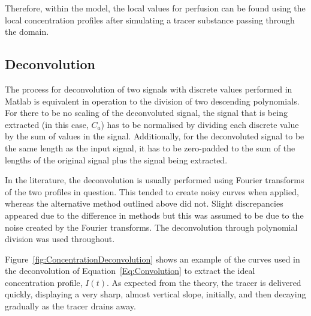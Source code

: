 \documentclass[11pt,english,a4paper,twoside,openright]{report}
\begin{document}
{{{{{{{{Therefore, within the model, the local values for perfusion can be found using the local concentration profiles after simulating a tracer substance passing through the domain.

\subsection{Deconvolution}

The process for deconvolution of two signals with discrete values performed in Matlab is equivalent in operation to the division of two descending polynomials. For there to be no scaling of the deconvoluted signal, the signal that is being extracted (in this case, $C_{a}$) has to be normalised by dividing each discrete value by the sum of values in the signal. Additionally, for the deconvoluted signal to be the same length as the input signal, it has to be zero-padded to the sum of the lengths of the original signal plus the signal being extracted.

In the literature, the deconvolution is usually performed using Fourier transforms of the two profiles in question. This tended to create noisy curves when applied, whereas the alternative method outlined above did not. Slight discrepancies appeared due to the difference in methods but this was assumed to be due to the noise created by the Fourier transforms. The deconvolution through polynomial division was used throughout. 

Figure~\ref{fig:ConcentrationDeconvolution} shows an example of the curves used in the deconvolution of Equation~\ref{Eq:Convolution} to extract the ideal concentration profile, $I(t)$. As expected from the theory, the tracer is delivered quickly, displaying a very sharp, almost vertical slope, initially, and then decaying gradually as the tracer drains away. 

}}}}}}}}
\end{document}
